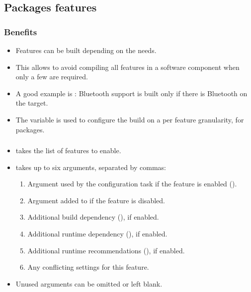 \subsection{Packages features}

\begin{frame}
  \frametitle{Benefits}
  \begin{itemize}
    \item Features can be built depending on the needs.
    \item This allows to avoid compiling all features in a software
      component when only a few are required.
    \item A good example is : Bluetooth support
      is built only if there is Bluetooth on the target.
    \item The  variable is used to configure the
      build on a per feature granularity, for packages.
  \end{itemize}
\end{frame}

\begin{frame}
  \frametitle{}
  \begin{itemize}
    \item {} takes the list of features to enable.
    \item {} takes up to six arguments,
      separated by commas:
      \begin{enumerate}
        \item Argument used by the configuration task if the feature
          is enabled ().
        \item Argument added to  if the feature is
          disabled.
        \item Additional build dependency (), if enabled.
        \item Additional runtime dependency (), if enabled.
        \item Additional runtime recommendations (), if enabled.
	\item Any conflicting  settings for this feature.
      \end{enumerate}
    \item Unused arguments can be omitted or left blank.
  \end{itemize}
\end{frame}

